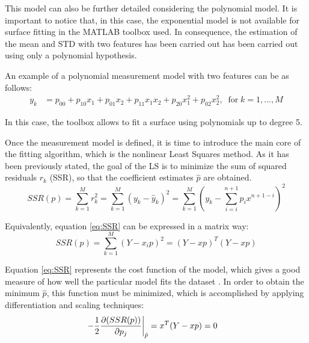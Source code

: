 \documentclass[a4paper, report, oneside, UKenglish]{memoir}
\begin{document}
This model can also be further detailed considering the polynomial model. It is important to notice that, in this case, the exponential model is not available for surface fitting in the MATLAB toolbox used. In consequence, the estimation of the mean and STD with two features has been carried out has been carried out using only a polynomial hypothesis.

An example of a polynomial measurement model with two features can be as follows:
\begin{equation}
\begin{split}
    y_k &= p_{00} + p_{10}x_{1} + p_{01}x_{2} + p_{11}x_{1}x_{2} + p_{20}x^{2}_{1} + p_{02}x^{2}_{2},    \;\;\mbox{for}\; k = 1,...,M
\end{split}
\end{equation}

In this case, the toolbox allows to fit a surface using polynomials up to degree 5. 

Once the measurement model is defined, it is time to introduce the main core of the fitting algorithm, which is the nonlinear Least Squares method. As it has been previously stated, the goal of the LS is to minimize the sum of squared residuals $r_k$ (SSR), so that the coefficient estimates $\hat{p}$ are obtained.
\begin{equation}\label{eq:SSR}
    SSR(p) = \sum\limits_{k=1}^{M}{r}_{k}^{2} = \sum\limits_{k=1}^{M}(y_k - \hat{y}_k)^2 = \sum\limits_{k=1}^{M}(y_k - \sum\limits_{i=i}^{n+1} p_{i}x^{n+1-i})^2
\end{equation}

Equivalently, equation \eqref{eq:SSR} can be expressed in a matrix way:
\begin{equation}
    SSR(p) = \sum\limits_{k=1}^{M}(Y - x_{i}p)^2 = (Y - xp)^T(Y - xp)
\end{equation}

Equation \eqref{eq:SSR} represents the cost function of the model, which gives a good measure of how well the particular model fits the dataset \cite{MachLearnRefined}. In order to obtain the minimum $\hat{p}$, this function must be minimized, which is accomplished by applying differentiation and scaling techniques:
\begin{equation}
\begin{split}
    \left.-\frac{1}{2}\pdv{(SSR(p))}{p_{j}}\right|_{\substack{\hat{p}}} &= x^{T}(Y - xp) = 0
\end{split}
\end{equation}
\end{document}
